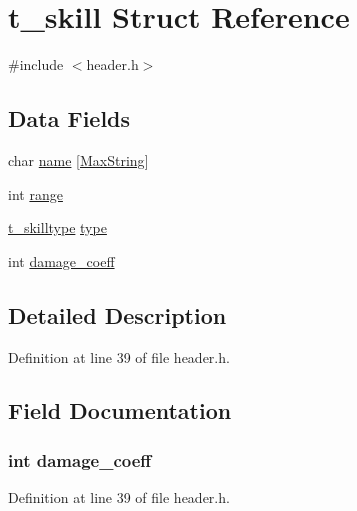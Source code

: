 \hypertarget{structt__skill}{\section{t\-\_\-skill Struct Reference}
\label{structt__skill}
}


{\ttfamily \#include $<$header.\-h$>$}

\subsection*{Data Fields}
\begin{DoxyCompactItemize}
\item 
char \hyperlink{structt__skill_ab27f28c5ead39031421706ddbbd1edea}{name} \mbox{[}\hyperlink{header_8h_ab154998a3a376095f3601bc35c5cf523}{Max\-String}\mbox{]}
\item 
int \hyperlink{structt__skill_a037e8e370380046bec287bdc96942091}{range}
\item 
\hyperlink{header_8h_a440f669d36bc2028077af38574051204}{t\-\_\-skilltype} \hyperlink{structt__skill_ac00edc3c188c78c47878a357ecff2954}{type}
\item 
int \hyperlink{structt__skill_a9518a5f7d916a01def3588da5dc0c8fa}{damage\-\_\-coeff}
\end{DoxyCompactItemize}


\subsection{Detailed Description}


Definition at line 39 of file header.\-h.



\subsection{Field Documentation}
\hypertarget{structt__skill_a9518a5f7d916a01def3588da5dc0c8fa}{
\subsubsection[{damage\-\_\-coeff}]{\setlength{\rightskip}{0pt plus 5cm}int damage\-\_\-coeff}}\label{structt__skill_a9518a5f7d916a01def3588da5dc0c8fa}


Definition at line 39 of file header.\-h.

